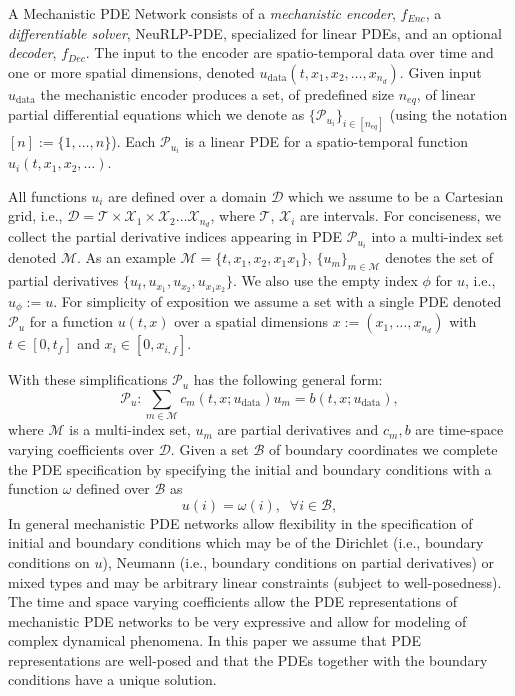 A Mechanistic PDE Network consists of a \emph{mechanistic encoder}, $f_{Enc}$, a \emph{differentiable solver}, NeuRLP-PDE, specialized for linear PDEs, and an optional \emph{decoder}, $f_{Dec}$.
The input to the encoder are spatio-temporal data over time and one or more spatial dimensions, denoted $u_{\text{data}}(t,x_1, x_2, \ldots, x_{n_d})$. 
Given input $u_{\text{data}}$ the mechanistic encoder produces a set, of predefined size $n_{eq}$, of linear partial differential equations which we denote as $\{\mathcal{P}_{u_i}\}_{i\in [n_{eq}]}$ (using the notation $[n] := \{1,\ldots,n\}$).
Each $\mathcal{P}_{u_i}$ is a linear PDE for a spatio-temporal function $u_i(t,x_1, x_2,\ldots)$. 

All functions $u_i$ are defined over a domain $\mathcal{D}$ which we assume to be a Cartesian grid, i.e., $\mathcal{D}=\mathcal{T}\times\mathcal{X}_1\times\mathcal{X}_2\ldots\mathcal{X}_{n_d}$, where $\mathcal{T}$, $\mathcal{X}_i$ are intervals.
For conciseness, we collect the partial derivative indices appearing in PDE $\mathcal{P}_{u_i}$ into a multi-index set denoted $\mathcal{M}$.
As an example $\mathcal{M} = \{t, x_1, x_2, x_1x_1\}$, $\{u_m\}_{m\in \mathcal{M}}$ denotes the set of partial derivatives $\{u_t, u_{x_1}, u_{x_2}, u_{x_1x_2}\}$.
We also use the empty index $\phi$ for $u$, i.e., $u_\phi := u$.
\begingroup
\setlength\abovedisplayskip{1.5pt}
\setlength\belowdisplayskip{1.5pt}
For simplicity of exposition we assume a set with a single PDE denoted $\mathcal{P}_u$ for a function $u(t,x)$ over a spatial dimensions $x:=(x_1,\ldots, x_{n_d})$ with $t \in[0, t_f]$ and $x_i \in [0, x_{i,f}]$. 

With these simplifications $\mathcal{P}_u$ has the following general form:
\begin{equation}
\mathcal{P}_{u}: \sum_{m\in\mathcal{M}}c_m(t,x; u_\text{data})u_m = b(t,x; u_\text{data}), \label{eq:linear-pde-model}
\end{equation}
where $\mathcal{M}$ is a multi-index set, $u_m$ are partial derivatives and $c_m, b$ are time-space varying coefficients over $\mathcal{D}$.
Given a set $\mathcal{B}$ of boundary coordinates we complete the PDE specification by specifying the initial and boundary conditions with a function $\omega$ defined over $\mathcal{B}$ as 
\[
u(i) = \omega(i), \;\; \forall i \in \mathcal{B},
\]
In general mechanistic PDE networks allow flexibility in the specification of initial and boundary conditions which may be of the Dirichlet (i.e., boundary conditions on $u$), Neumann (i.e., boundary conditions on partial derivatives) or mixed types and may be arbitrary linear constraints (subject to well-posedness).
The time and space varying coefficients allow the PDE representations of mechanistic PDE networks to be very expressive and allow for modeling of complex dynamical phenomena.
In this paper we assume that PDE representations are well-posed and that the PDEs together with the boundary conditions have a unique solution.

